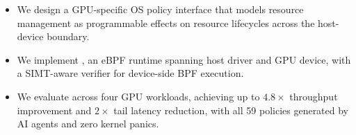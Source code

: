 
\begin{itemize}[leftmargin=*,itemsep=0pt]
  \item We design a GPU-specific OS policy interface that models resource management as programmable effects on resource lifecycles across the host-device boundary.
  \item We implement \sys, an eBPF runtime spanning host driver and GPU device, with a SIMT-aware verifier for device-side BPF execution.
  \item We evaluate across four GPU workloads, achieving up to $4.8\times$ throughput improvement and $2\times$ tail latency reduction, with all 59 policies generated by AI agents and zero kernel panics.
\end{itemize}

